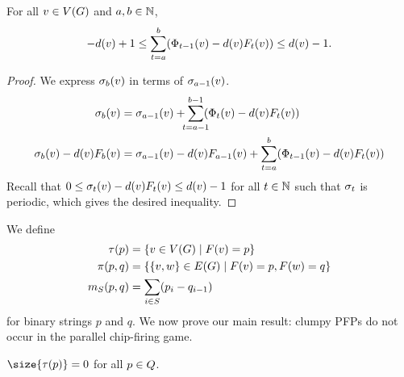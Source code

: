 \begin{lem}\label{strongbg}
For all $v \in \V$ and $a, b \in \nats$,
\begin{equation}\label{local}
  -\deg{v} + 1 \leq \sum_{t=a}^{b}(\receiving{v}{t-1} - \deg{v}\firing{v}{t})
  \leq \deg{v}-1.
\end{equation}
\end{lem}

\begin{proof}
We express $\chips{v}{b}$ in terms of $\chips{v}{a-1}$.
\begin{align*}
  \chips{v}{b} &= \chips{v}{a-1} +
  \smashoperator{\sum_{t=a-1}}^{b-1}(\receiving{v}{t} - \deg{v}\firing{v}{t})
  \\
  \chips{v}{b} - \deg{v}\firing{v}{b} &= \chips{v}{a-1} -
  \deg{v}\firing{v}{a-1} + \sum_{t=a}^{b}(\receiving{v}{t-1} -
  \deg{v}\firing{v}{t})
\end{align*}
Recall that $0 \leq \chips{v}{t} - \deg{v}\firing{v}{t} \leq \deg{v} - 1$ for
all $t \in \nats$ such that $\pos{t}$ is periodic, which gives the desired
inequality.
\end{proof}

We define
\begin{align*}
\pfpverts{p} &= {\set{v \in \V}{\pfp{v}=p}} \\
\pfpedges{p}{q} &= {\set{\{v,w\} \in \E}{\pfp{v}=p, \pfp{w} = q}} \\
\misb{S}{p}{q} &= \sum_{i \in S}(p_{i} - q_{i-1})
\end{align*}
for binary strings $p$ and $q$. We now prove our main result: clumpy PFPs do
not occur in the parallel chip-firing game.

\begin{thm}\label{nct}
$\size{\pfpverts{p}} = 0$ for all $p \in \cpfps$.
\end{thm}

